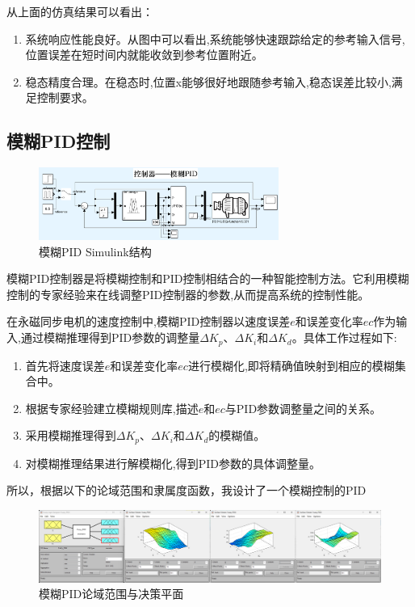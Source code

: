 \documentclass[12pt,a4paper,UTF8]{article}
\begin{document}
从上面的仿真结果可以看出：

\begin{enumerate}
\item 系统响应性能良好。从图中可以看出,系统能够快速跟踪给定的参考输入信号,位置误差在短时间内就能收敛到参考位置附近。

\item 稳态精度合理。在稳态时,位置x能够很好地跟随参考输入,稳态误差比较小,满足控制要求。
\end{enumerate}
\newpage
\subsection{模糊PID控制}

\begin{figure}[htbp] \centering \includegraphics[width=0.7\textwidth]{2024-12-30-12-22-09.png} \caption{模糊PID Simulink结构}\end{figure}

模糊PID控制器是将模糊控制和PID控制相结合的一种智能控制方法。它利用模糊控制的专家经验来在线调整PID控制器的参数,从而提高系统的控制性能。

在永磁同步电机的速度控制中,模糊PID控制器以速度误差$e$和误差变化率$ec$作为输入,通过模糊推理得到PID参数的调整量$\Delta K_p$、$\Delta K_i$和$\Delta K_d$。具体工作过程如下:

\begin{enumerate}
\item 首先将速度误差$e$和误差变化率$ec$进行模糊化,即将精确值映射到相应的模糊集合中。
\item 根据专家经验建立模糊规则库,描述$e$和$ec$与PID参数调整量之间的关系。
\item 采用模糊推理得到$\Delta K_p$、$\Delta K_i$和$\Delta K_d$的模糊值。
\item 对模糊推理结果进行解模糊化,得到PID参数的具体调整量。
\end{enumerate}


所以，根据以下的论域范围和隶属度函数，我设计了一个模糊控制的PID


\begin{figure}[htbp] \centering \includegraphics[width=\textwidth]{2024-12-30-12-30-02.png} \caption{模糊PID论域范围与决策平面}\end{figure}
\end{document}
